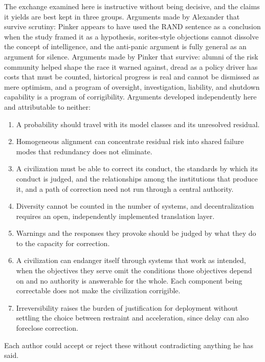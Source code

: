 \documentclass[11pt]{article}
\begin{document}
The exchange examined here is instructive without being decisive, and the claims it yields are best kept in three groups. Arguments made by Alexander that survive scrutiny: Pinker appears to have used the RAND sentence as a conclusion when the study framed it as a hypothesis, sorites-style objections cannot dissolve the concept of intelligence, and the anti-panic argument is fully general as an argument for silence. Arguments made by Pinker that survive: alumni of the risk community helped shape the race it warned against, dread as a policy driver has costs that must be counted, historical progress is real and cannot be dismissed as mere optimism, and a program of oversight, investigation, liability, and shutdown capability is a program of corrigibility. Arguments developed independently here and attributable to neither:
\begin{enumerate}
\item A probability should travel with its model classes and its unresolved residual.
\item Homogeneous alignment can concentrate residual risk into shared failure modes that redundancy does not eliminate.
\item A civilization must be able to correct its conduct, the standards by which its conduct is judged, and the relationships among the institutions that produce it, and a path of correction need not run through a central authority.
\item Diversity cannot be counted in the number of systems, and decentralization requires an open, independently implemented translation layer.
\item Warnings and the responses they provoke should be judged by what they do to the capacity for correction.
\item A civilization can endanger itself through systems that work as intended, when the objectives they serve omit the conditions those objectives depend on and no authority is answerable for the whole. Each component being correctable does not make the civilization corrigible.
\item Irreversibility raises the burden of justification for deployment without settling the choice between restraint and acceleration, since delay can also foreclose correction.
\end{enumerate}
Each author could accept or reject these without contradicting anything he has said.
\end{document}
